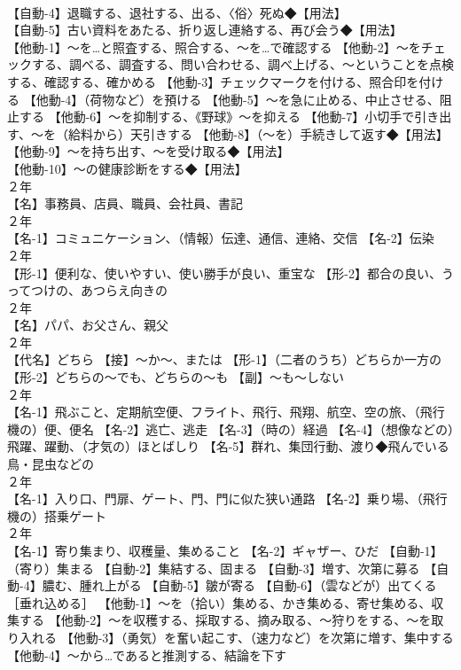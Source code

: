 \documentclass[8pt]{extreport}
\begin{document}
\begin{CJK}{UTF8}{min}
\\	【自動-4】退職する、退社する、出る、〈俗〉死ぬ◆【用法】
\\	【自動-5】古い資料をあたる、折り返し連絡する、再び会う◆【用法】
\\	【他動-1】～を…と照査する、照合する、～を…で確認する 【他動-2】～をチェックする、調べる、調査する、問い合わせる、調べ上げる、～ということを点検する、確認する、確かめる 【他動-3】チェックマークを付ける、照合印を付ける 【他動-4】（荷物など）を預ける 【他動-5】～を急に止める、中止させる、阻止する 【他動-6】～を抑制する、《野球》～を抑える 【他動-7】小切手で引き出す、～を（給料から）天引きする 【他動-8】（～を）手続きして返す◆【用法】
\\	【他動-9】～を持ち出す、～を受け取る◆【用法】
\\	【他動-10】～の健康診断をする◆【用法】
\\	２年	
\\	【名】事務員、店員、職員、会社員、書記
\\	２年	
\\	【名-1】コミュニケーション、（情報）伝達、通信、連絡、交信 【名-2】伝染
\\	２年	
\\	【形-1】便利な、使いやすい、使い勝手が良い、重宝な 【形-2】都合の良い、うってつけの、あつらえ向きの
\\	２年	
\\	【名】パパ、お父さん、親父
\\	２年	
\\	【代名】どちら 【接】～か～、または 【形-1】（二者のうち）どちらか一方の 【形-2】どちらの～でも、どちらの～も 【副】～も～しない
\\	２年	
\\	【名-1】飛ぶこと、定期航空便、フライト、飛行、飛翔、航空、空の旅、（飛行機の）便、便名 【名-2】逃亡、逃走 【名-3】（時の）経過 【名-4】（想像などの）飛躍、躍動、（才気の）ほとばしり 【名-5】群れ、集団行動、渡り◆飛んでいる鳥・昆虫などの
\\	２年	
\\	【名-1】入り口、門扉、ゲート、門、門に似た狭い通路 【名-2】乗り場、（飛行機の）搭乗ゲート
\\	２年	
\\	【名-1】寄り集まり、収穫量、集めること 【名-2】ギャザー、ひだ 【自動-1】（寄り）集まる 【自動-2】集結する、固まる 【自動-3】増す、次第に募る 【自動-4】膿む、腫れ上がる 【自動-5】皺が寄る 【自動-6】（雲などが）出てくる［垂れ込める］ 【他動-1】～を（拾い）集める、かき集める、寄せ集める、収集する 【他動-2】～を収穫する、採取する、摘み取る、～狩りをする、～を取り入れる 【他動-3】（勇気）を奮い起こす、（速力など）を次第に増す、集中する 【他動-4】～から…であると推測する、結論を下す

\end{CJK}
\end{document}
